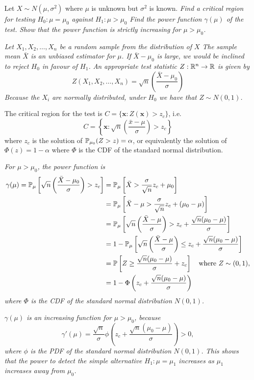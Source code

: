 \begin{example}[$z$-test]
Let $X\sim N(\mu,\sigma^2)$ where $\mu$ is unknown but $\sigma^2$ is known. 
\ben
\it Find a critical region for testing $H_0:\mu=\mu_0$ against $H_1:\mu > \mu_0$
\it Find the power function $\gamma(\mu)$ of the test.
\it Show that the power function is strictly increasing for $\mu>\mu_0$. %
\een
\end{example}

\begin{solution}
\ben
\it %
Let $X_1,X_2,\ldots,X_n$ be a random sample from the distribution of $X$
\bit
\it The sample mean $\bar{X}$ is an unbiased estimator for $\mu$.
\it If $\bar{X}-\mu_0$ is large, we would be inclined to reject $H_0$ in favour of $H_1$.
\eit
An appropriate test statistic $Z:\mathbb{R}^n\to\mathbb{R}$ is given by
\[
Z(X_1,X_2,\ldots,X_n) = \sqrt{n}\left(\frac{\bar{X}-\mu_0}{\sigma}\right)
\]
Because the $X_i$ are normally distributed, under $H_0$ we have that $Z\sim N(0,1)$. 

\bigskip
The critical region for the test is
$C=\{\mathbf{x}:Z(\mathbf{x})> z_c\}$, i.e.
\[
C=\left\{\mathbf{x}: \sqrt{n}\left(\frac{\bar{x}-\mu}{\sigma}\right) > z_c\right\}
\]
where $z_c$ is the solution of $\mathbb{P}_{\mu_0}(Z > z)=\alpha$, or equivalently the solution of $\Phi(z)=1-\alpha$ where $\Phi$ is the CDF of the standard normal distribution.

\it %
For $\mu > \mu_0$, the power function is
\begin{align*}
\gamma(\mu) 
	= \mathbb{P}_{\mu}\left[\sqrt{n}\left(\frac{\bar{X}-\mu_0}{\sigma}\right) > z_c\right] 
	& = \mathbb{P}_{\mu}\left[\bar{X} > \frac{\sigma}{\sqrt{n}}z_c+\mu_0\right] \\
	& = \mathbb{P}_{\mu}\left[\bar{X}-\mu > \frac{\sigma}{\sqrt{n}}z_c + (\mu_0-\mu)\right] \\
	& = \mathbb{P}_{\mu}\left[\sqrt{n}\left(\frac{\bar{X}-\mu}{\sigma}\right) > z_c + \frac{\sqrt{n}(\mu_0-\mu)}{\sigma}\right] \\
	& = 1 - \mathbb{P}_{\mu}\left[\sqrt{n}\left(\frac{\bar{X}-\mu}{\sigma}\right) \leq z_c + \frac{\sqrt{n}(\mu_0-\mu)}{\sigma}\right] \\
	& = \mathbb{P}\left[Z \geq \frac{\sqrt{n}(\mu_0-\mu)}{\sigma} + z_c\right] \text{\quad where $Z\sim(0,1)$},\\
	& = 1 - \Phi\left(z_c + \frac{\sqrt{n}(\mu_0-\mu)}{\sigma}\right)
\end{align*}	
where $\Phi$ is the CDF of the standard normal distribution $N(0,1)$.

\it %
$\gamma(\mu)$ is an increasing function for $\mu>\mu_0$, because
\[
\gamma'(\mu) = \frac{\sqrt{n}}{\sigma} \phi\left(z_c + \frac{\sqrt{n}(\mu_0-\mu)}{\sigma}\right) > 0,
\]
where $\phi$ is the PDF of the standard normal distribution $N(0,1)$. This shows that the power to detect the simple alternative $H_1:\mu=\mu_1$ increases as $\mu_1$ increases away from $\mu_0$.
\een
\end{solution}

